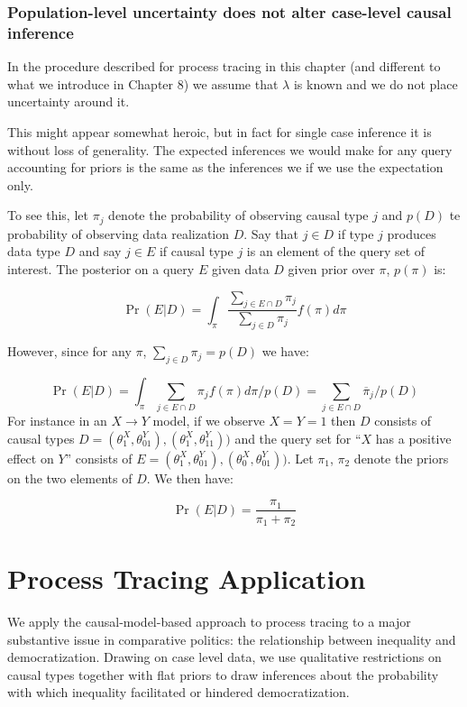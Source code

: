 \documentclass[
  12pt,
]{book}
\newenvironment{headerbox}{
  \definecolor{shadecolor}{rgb}{0.8, 0.8, 0.8}  %
  \color{black}
  \begin{shaded}}{\end{shaded}}
\begin{document}
\hypertarget{population-level-uncertainty-does-not-alter-case-level-causal-inference}{%
\subsection{Population-level uncertainty does not alter case-level causal inference}\label{population-level-uncertainty-does-not-alter-case-level-causal-inference}}

In the procedure described for process tracing in this chapter (and different to what we introduce in Chapter 8) we assume that \(\lambda\) is known and we do not place uncertainty around it.

This might appear somewhat heroic, but in fact for single case inference it is without loss of generality. The expected inferences we would make for any query accounting for priors is the same as the inferences we if we use the expectation only.

To see this, let \(\pi_j\) denote the probability of observing causal type \(j\) and \(p(D)\) te probability of observing data realization \(D\). Say that \(j \in D\) if type \(j\) produces data type \(D\) and say \(j \in E\) if causal type \(j\) is an element of the query set of interest.
The posterior on a query \(E\) given data \(D\) given prior over \(\pi\), \(p(\pi)\) is:

\[\Pr(E | D) = \int_\pi  \frac{\sum_{j \in E \cap D}\pi_j}{\sum_{j \in D}\pi_j} f(\pi)d\pi\]

However, since for any \(\pi\), \(\sum_{j \in D}\pi_j = p(D)\) we have:

\[\Pr(E | D) = \int_\pi  \sum_{j \in E \cap D}\pi_j f(\pi)d\pi/p(D) = \sum_{j \in  E \cap D} \overline{\pi}_j/p(D)\]
For instance in an \(X \rightarrow Y\) model, if we observe \(X=Y=1\) then \(D\) consists of causal types \(D={(\theta^X_1, \theta^Y_{01}), (\theta^X_1, \theta^Y_{11})})\) and the query set for ``\(X\) has a positive effect on \(Y\)'' consists of \(E={(\theta^X_1, \theta^Y_{01}), (\theta^X_0, \theta^Y_{01})})\). Let \(\pi_1\), \(\pi_2\) denote the priors on the two elements of \(D\). We then have:

\[\Pr(E | D) =  \frac{\pi_1}{\pi_1 + \pi_2}\]

\hypertarget{ptapp}{%
\chapter{Process Tracing Application}\label{ptapp}}

\begin{headerbox}
We apply the causal-model-based approach to process tracing to a major substantive issue in comparative politics: the relationship between inequality and democratization. Drawing on case level data, we use qualitative restrictions on causal types together with flat priors to draw inferences about the probability with which inequality facilitated or hindered democratization.

\end{headerbox}
\end{document}
